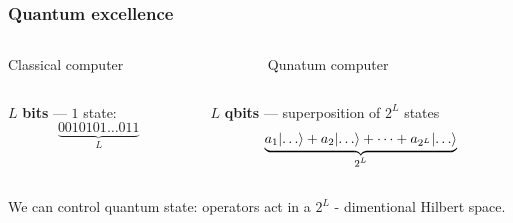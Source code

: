 \documentclass{beamer}
\DeclarePairedDelimiter\ket{\lvert}{\rangle}
\begin{document}
\begin{frame}
\frametitle{Quantum excellence}

\begin{columns}
\begin{column}{0.5\textwidth}
\begin{center}
Classical computer
\end{center}
\end{column}

\begin{column}{0.5\textwidth}
\begin{center}
Qunatum computer
\end{center}
\end{column}
\end{columns}

\begin{columns}
\begin{column}{0.5\textwidth}

\begin{center}
$L$ {\bf bits} --- $1$ state:
$$\underbrace{0010101 \dots 011}_\text{$L$}$$
\end{center}

\end{column}
\begin{column}{0.5\textwidth}

\begin{center}
$L$ {\bf qbits} --- superposition of $2^L$ states
$$\underbrace{a_1 \ket{\dots} + a_2 \ket{\dots} + \dots + a_{2^L} \ket{\dots}}_\text{$2^L$}$$

\color{red}{$2^L$ complex amplitudes!}
\end{center}

\end{column}
\end{columns}

\vspace{1cm}

We can control quantum state: operators act in a $2^L$ - dimentional Hilbert space.
\end{frame}
\end{document}
